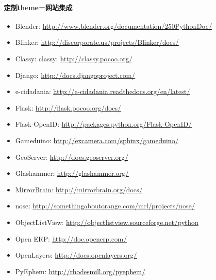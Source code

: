 \documentclass[letterpaper,10pt,english]{sphinxmanual}
\begin{document}
\paragraph{定制theme－网站集成}
\label{jupyter/sphinx_quickstart:_u5b9a_u5236theme_uff0d_u7f51_u7ad9_u96c6_u6210}\begin{itemize}
\item {} 
Blender: \url{http://www.blender.org/documentation/250PythonDoc/}

\item {} 
Blinker: \url{http://discorporate.us/projects/Blinker/docs/}

\item {} 
Classy: classy: \url{http://classy.pocoo.org/}

\item {} 
Django: \url{http://docs.djangoproject.com/}

\item {} 
e-cidadania: \url{http://e-cidadania.readthedocs.org/en/latest/}

\item {} 
Flask: \url{http://flask.pocoo.org/docs/}

\item {} 
Flask-OpenID: \url{http://packages.python.org/Flask-OpenID/}

\item {} 
Gameduino: \url{http://excamera.com/sphinx/gameduino/}

\item {} 
GeoServer: \url{http://docs.geoserver.org/}

\item {} 
Glashammer: \url{http://glashammer.org/}

\item {} 
MirrorBrain: \url{http://mirrorbrain.org/docs/}

\item {} 
nose: \url{http://somethingaboutorange.com/mrl/projects/nose/}

\item {} 
ObjectListView: \url{http://objectlistview.sourceforge.net/python}

\item {} 
Open ERP: \url{http://doc.openerp.com/}

\item {} 
OpenLayers: \url{http://docs.openlayers.org/}

\item {} 
PyEphem: \url{http://rhodesmill.org/pyephem/}


\end{itemize}
\end{document}
